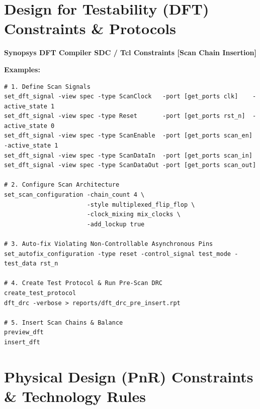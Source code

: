 \documentclass[11pt,a4paper]{article}
\newenvironment{cmdbox}[2]{%
  \begin{mdframed}[style=cmdstyle]%
  {\bfseries\sffamily\color{primary}#1 \hfill \footnotesize\color{mutedgray}[#2]}\par\vspace{3pt}%
}{%
  \end{mdframed}%
}
\begin{document}
\section{Design for Testability (DFT) Constraints \& Protocols}

\begin{cmdbox}{Synopsys DFT Compiler SDC / Tcl Constraints}{Scan Chain Insertion}
\textbf{Examples:}
\begin{lstlisting}[style=sdcstyle]
# 1. Define Scan Signals
set_dft_signal -view spec -type ScanClock   -port [get_ports clk]    -active_state 1
set_dft_signal -view spec -type Reset       -port [get_ports rst_n]  -active_state 0
set_dft_signal -view spec -type ScanEnable  -port [get_ports scan_en] -active_state 1
set_dft_signal -view spec -type ScanDataIn  -port [get_ports scan_in]
set_dft_signal -view spec -type ScanDataOut -port [get_ports scan_out]

# 2. Configure Scan Architecture
set_scan_configuration -chain_count 4 \
                       -style multiplexed_flip_flop \
                       -clock_mixing mix_clocks \
                       -add_lockup true

# 3. Auto-fix Violating Non-Controllable Asynchronous Pins
set_autofix_configuration -type reset -control_signal test_mode -test_data rst_n

# 4. Create Test Protocol & Run Pre-Scan DRC
create_test_protocol
dft_drc -verbose > reports/dft_drc_pre_insert.rpt

# 5. Insert Scan Chains & Balance
preview_dft
insert_dft
\end{lstlisting}
\end{cmdbox}

\section{Physical Design (PnR) Constraints \& Technology Rules}
\end{document}
